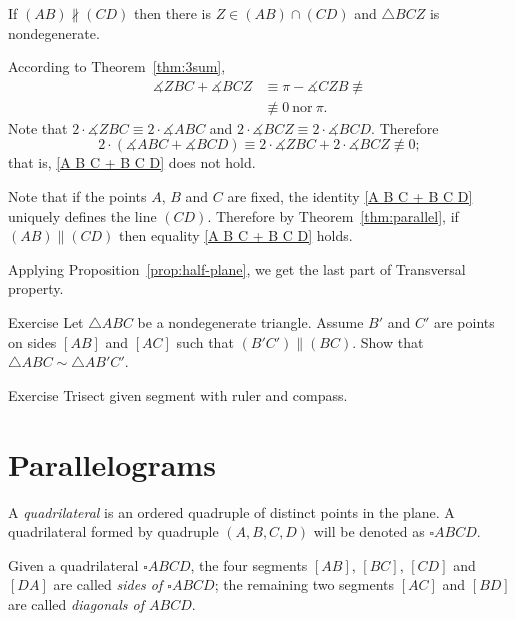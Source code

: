 If $(AB)\nparallel(C D)$
then there is $Z\in (AB)\cap(C D)$ 
and $\triangle BCZ$ is nondegenerate.

According to Theorem~\ref{thm:3sum}, 
\begin{align*}
\measuredangle ZBC+\measuredangle BCZ&\equiv \pi-\measuredangle CZB\not\equiv 
\\&\not\equiv 0\ \text{nor}\ \pi.
\end{align*}
Note that $2\cdot\measuredangle Z B C\equiv 2\cdot\measuredangle A B C$ and $2\cdot\measuredangle B C Z\equiv2\cdot\measuredangle B C D$.
Therefore 
$$2\cdot(\measuredangle A B C+\measuredangle B C D)\equiv 2\cdot\measuredangle Z B C +2\cdot\measuredangle B C Z\not\equiv 0;$$
that is, \ref{A B C + B C D} does not hold.

Note that if the points $A$, $B$ and $C$ are fixed,
the identity \ref{A B C + B C D} uniquely defines the line $(C D)$.
Therefore by Theorem~\ref{thm:parallel}, if $(AB)\parallel(C D)$ then equality \ref{A B C + B C D} holds.

Applying Proposition~\ref{prop:half-plane},
we get the last part of Transversal property.
\qeds


\begin{thm}{Exercise}\label{ex:smililar+parallel}
Let $\triangle ABC$ be a nondegenerate triangle.
Assume $B'$ and $C'$ are points on sides $[AB]$ and $[AC]$ such that $(B'C')\parallel(BC)$.
Show that $\triangle ABC\sim\triangle AB'C'$.
\end{thm}

\begin{thm}{Exercise}\label{ex:trisection}
Trisect given segment with ruler and compass.
\end{thm}





\section*{Parallelograms}

A \emph{quadrilateral} is an ordered quadruple of distinct points in the plane.
A quadrilateral formed by quadruple $(A,B,C,D)$ will be denoted as $\square ABCD$.

Given a quadrilateral $\square ABCD$,
the four segments $[AB]$, $[BC]$, $[CD]$ and $[DA]$ are called \emph{sides of $\square ABCD$};
the remaining two segments $[AC]$ and $[BD]$ are called \emph{diagonals of $ABCD$}.



